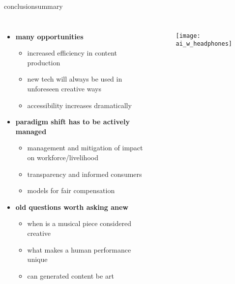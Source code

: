 \begin{frame}{conclusion}{summary}
    \vspace{-7mm}
    \begin{columns}
        \begin{itemize}
             \item   \textbf{many opportunities}
                \begin{itemize}
                    \item increased efficiency in content production
                    \item new tech will always be used in unforeseen creative ways
                    \item accessibility increases dramatically
                \end{itemize}
            \smallskip
           \item   \textbf{paradigm shift has to be actively managed}
                \begin{itemize}
                    \item management and mitigation of impact on workforce/livelihood
                    \item transparency and informed consumers
                    \item models for fair compensation
                \end{itemize}
            \smallskip
            \item   \textbf{old questions worth asking anew}
                \begin{itemize}
                    \item when is a musical piece considered creative
                    \item what makes a human performance unique
                    \item can generated content be art
                \end{itemize}
        \end{itemize}
        \vspace{10mm}
        \begin{figure}%
            \texttt{[image: ai\_w\_headphones]}%
        \end{figure}
    \end{columns}
\end{frame}
